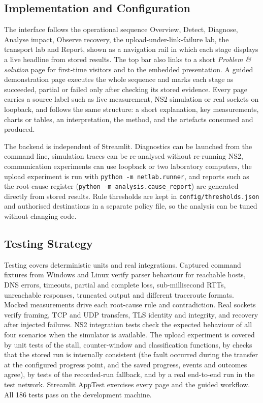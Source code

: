 \documentclass[12pt,a4paper]{report}
\numberwithin{equation}{chapter}
\newcommand{\testCount}{186}
\begin{document}
\subsection{Implementation and Configuration}
The interface follows the operational sequence Overview, Detect, Diagnose, Analyse impact, Observe recovery, the upload-under-link-failure lab, the transport lab and Report, shown as a navigation rail in which each stage displays a live headline from stored results. The top bar also links to a short \emph{Problem \& solution} page for first-time visitors and to the embedded presentation. A guided demonstration page executes the whole sequence and marks each stage as succeeded, partial or failed only after checking its stored evidence. Every page carries a source label such as live measurement, NS2 simulation or real sockets on loopback, and follows the same structure: a short explanation, key measurements, charts or tables, an interpretation, the method, and the artefacts consumed and produced.

The backend is independent of Streamlit. Diagnostics can be launched from the command line, simulation traces can be re-analysed without re-running NS2, communication experiments can use loopback or two laboratory computers, the upload experiment is run with \texttt{python -m netlab.runner}, and reports such as the root-cause register (\texttt{python -m analysis.cause\_report}) are generated directly from stored results. Rule thresholds are kept in \texttt{config/thresholds.json} and authorised destinations in a separate policy file, so the analysis can be tuned without changing code.

\subsection{Testing Strategy}
Testing covers deterministic units and real integrations. Captured command fixtures from Windows and Linux verify parser behaviour for reachable hosts, DNS errors, timeouts, partial and complete loss, sub-millisecond RTTs, unreachable responses, truncated output and different traceroute formats. Mocked measurements drive each root-cause rule and contradiction. Real sockets verify framing, TCP and UDP transfers, TLS identity and integrity, and recovery after injected failures. NS2 integration tests check the expected behaviour of all four scenarios when the simulator is available. The upload experiment is covered by unit tests of the stall, counter-window and classification functions, by checks that the stored run is internally consistent (the fault occurred during the transfer at the configured progress point, and the saved progress, events and outcomes agree), by tests of the recorded-run fallback, and by a real end-to-end run in the test network. Streamlit AppTest exercises every page and the guided workflow. All \testCount{} tests pass on the development machine.
\end{document}

